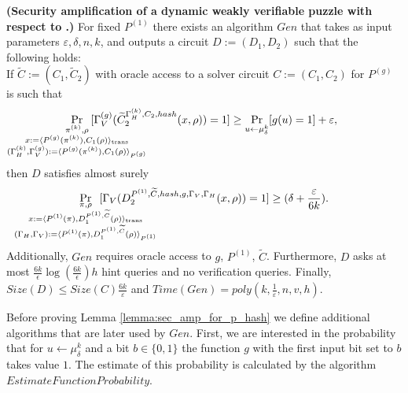 %
%
\begin{lemma}\textbf{(Security amplification of a dynamic weakly verifiable puzzle with respect to .)}
  \label{lemma:sec_amp_for_p_hash}
  For fixed $P^{(1)}$ there exists an algorithm $Gen$ that takes as input parameters $\varepsilon, \delta, n, k$,
  and outputs a circuit $D := (D_1, D_2)$ such that the following holds: \\
  If $\widetilde{C} := (C_1, \widetilde{C}_2)$ with oracle access to a solver circuit $C := (C_1, C_2)$ for $P^{(g)}$ is such that
  \begin{align*}
    \underset{\mathclap{\substack{
          \pi^{(k)}, \rho \\
          x:= \langle P^{(g)}(\pi^{(k)}), {C}_1(\rho) \rangle_{\text{trans}} \\
          (\Gamma_H^{(k)}, \Gamma_V^{(g)}) := \langle P^{(g)}(\pi^{(k)}), C_1(\rho) \rangle_{P^{(g)}}}}}
    {\Pr}\mkern13mu[\Gamma_V^{(g)}(\widetilde{C}_2^{\Gamma_H^{(k)}, C_2, hash}(x,\rho)) = 1]
    \geq \underset{u \leftarrow \mu_\delta^k}{\Pr}[g(u) = 1] + \varepsilon,
  \end{align*}
  then $D$ satisfies almost surely
  \begin{align*}
    \underset{
      \mathclap{
      \substack{
        \pi, \rho \\
        x := \langle P^{(1)}(\pi), D_1^{P^{(1)}, \widetilde{C}}(\rho) \rangle_{\text{trans}} \\
        (\Gamma_H, \Gamma_V) := \langle P^{(1)}(\pi), D_1^{P^{(1)}, \widetilde{C}}(\rho) \rangle_{P^{(1)}}}}}
    {\Pr}\mkern13mu[\Gamma_V(D_2^{P^{(1)}, \widetilde{C}, hash, g, \Gamma_V, \Gamma_H}(x, \rho)) = 1] \geq (\delta + \frac{\varepsilon}{6k}).
  \end{align*}
  Additionally, $Gen$ requires oracle access to $g$, $P^{(1)}$, $\widetilde{C}$.
  Furthermore, $D$ asks at most $\frac{6k}{\epsilon}\log\left(\frac{6k}{\epsilon}\right) h$ hint queries and no verification queries.
  Finally, $Size(D) \leq Size(C)\frac{6k}{\varepsilon}$ and $Time(Gen) = poly(k, \frac{1}{\varepsilon}, n, v, h)$.
\end{lemma}
%
%
Before proving Lemma \ref{lemma:sec_amp_for_p_hash} we define additional algorithms that are later used by $Gen$.
First, we are interested in the probability that for $u \leftarrow \mu_{\delta}^k$ and a bit $b \in \{0,1\}$ the function $g$
with the first input bit set to $b$ takes value $1$. The estimate of this probability is calculated by the algorithm
$EstimateFunctionProbability$.
%
